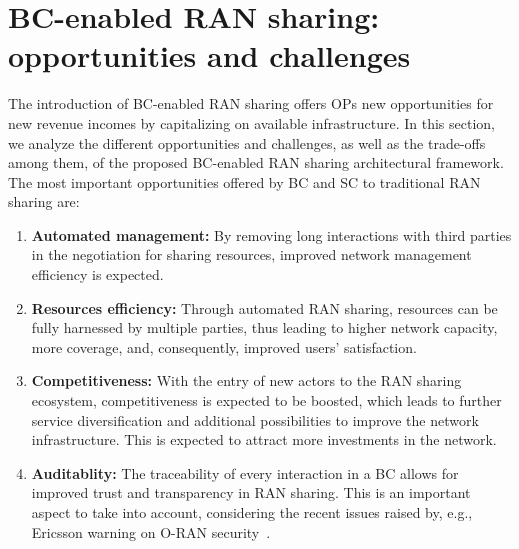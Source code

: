\documentclass[journal]{IEEEtran}
\begin{document}
\section{BC-enabled RAN sharing: opportunities and challenges}
\label{section:results}
The introduction of BC-enabled RAN sharing offers OPs new opportunities for new revenue incomes by capitalizing on available infrastructure. In this section, we analyze the different opportunities and challenges, as well as the trade-offs among them, of the proposed BC-enabled RAN sharing architectural framework. The most important opportunities offered by BC and SC to traditional RAN sharing are:
\begin{enumerate}
    \item \textbf{Automated management:} By removing long interactions with third parties in the negotiation for sharing resources, improved network management efficiency is expected.
    \item \textbf{Resources efficiency:} Through automated RAN sharing, resources can be fully harnessed by multiple parties, thus leading to higher network capacity, more coverage, and, consequently, improved users' satisfaction.
    \item \textbf{Competitiveness:} With the entry of new actors to the RAN sharing ecosystem, competitiveness is expected to be boosted, which leads to further service diversification and additional possibilities to improve the network infrastructure. This is expected to attract more investments in the network.
    \item \textbf{Auditablity:} The traceability of every interaction in a BC allows for improved trust and transparency in RAN sharing. This is an important aspect to take into account, considering the recent issues raised by, e.g., Ericsson warning on O-RAN security~\cite{boswell2020security}.
\end{enumerate}
\end{document}
